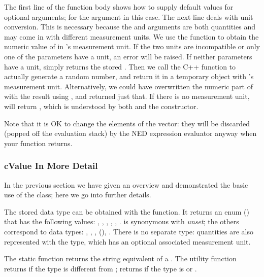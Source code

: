 The first line of the function body shows how to supply default values for
optional arguments; for the  argument in this case. The next line
deals with unit conversion. This is necessary because the  and
 arguments are both quantities and may come in with different
measurement units. We use the  function to
obtain the numeric value of  in 's measurement unit. If the
two units are incompatible or only one of the parameters have a unit, an
error will be raised. If neither parameters have a unit,
 simply returns the stored . Then we
call the  C++ function to actually generate a random number,
and return it in a temporary object with 's measurement unit.
Alternatively, we could have overwritten the numeric part of  with
the result using , and returned just that. If
there is no measurement unit,  will return ,
which is understood by both  and the
 constructor.

\begin{note}
Note that it is OK to change the elements of the  vector: they
will be discarded (popped off the evaluation stack) by the NED expression
evaluator anyway when your function returns.
\end{note}


\subsubsection{cValue In More Detail}
\label{sec:sim-lib:cvalue-in-more-detail}

In the previous section we have given an overview and demonstrated the basic
use of the  class; here we go into further details.

The stored data type can be obtained with the  function.
It returns an enum () that has the following values:
, , , , , .
 is synonymous with \textit{unset}; the others correspond to data
types: , , , 
(), .
There is no separate  type: quantities are also represented with
the  type, which has an optional associated measurement unit.

The  static function returns the string equivalent of
a . The utility function  returns 
if the type is different from ;  returns 
if the type is  or .

